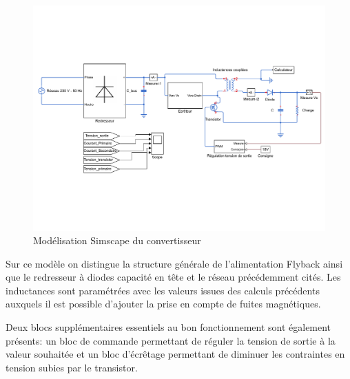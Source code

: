 \documentclass[12pt]{article}
\begin{document}
\begin{figure}[!h]
  \hspace{-60pt}
  \includegraphics[width=20cm,trim=0cm 5cm 0cm 5cm, clip=true]{Images_Rapport/flyback_simscape}
  
  
  \caption{Modélisation Simscape du convertisseur }
  
\end{figure}

Sur ce modèle on distingue la structure générale de l'alimentation Flyback ainsi que le redresseur à diodes capacité en tête et le réseau précédemment cités. Les inductances sont paramétrées avec les valeurs issues des calculs précédents auxquels il est possible d'ajouter la prise en compte de fuites magnétiques.\par 
Deux blocs supplémentaires essentiels au bon fonctionnement sont également présents: un bloc de commande permettant de réguler la tension de sortie à la valeur souhaitée et un bloc d'écrêtage permettant de diminuer les contraintes en tension subies par le transistor.\par 
\end{document}

